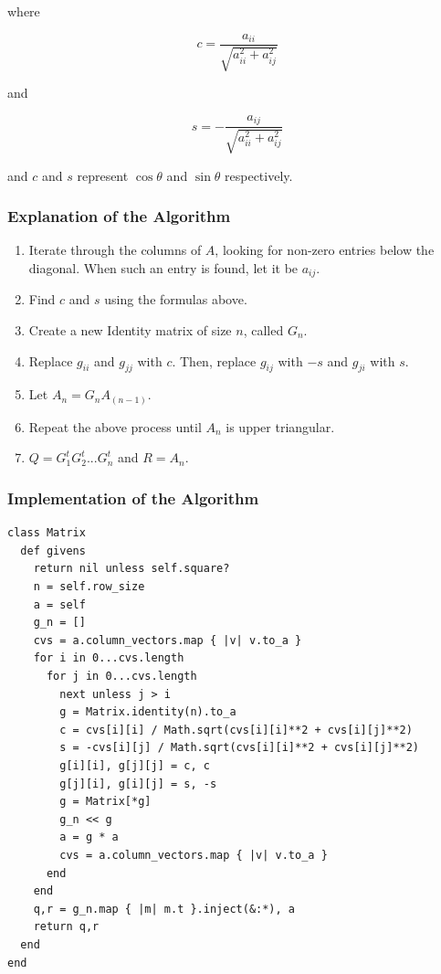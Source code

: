 \documentclass[letterpaper,12pt]{article}
\begin{document}
where

\[c = \frac{a_{ii}}{\sqrt{a^2_{ii} + a^2_{ij}}}\]

and

\[s = - \frac{a_{ij}}{\sqrt{a^2_{ii} + a^2_{ij}}}\]

and $c$ and $s$ represent $\cos{\theta}$ and $\sin{\theta}$ respectively.

\subsubsection{Explanation of the Algorithm}

\begin{enumerate}
\item Iterate through the columns of $A$, looking for non-zero entries below the diagonal.
  When such an entry is found, let it be $a_{ij}$.

\item Find $c$ and $s$ using the formulas above.

\item Create a new Identity matrix of size $n$, called $G_n$.

\item Replace $g_{ii}$ and $g_{jj}$ with $c$.
  Then, replace $g_{ij}$ with $-s$ and $g_{ji}$ with $s$.

\item Let $A_n = G_n A_{(n - 1)}$.

\item Repeat the above process until $A_n$ is upper triangular.

\item $Q = G_1^t G_2^t ... G_n^t$ and $R = A_n$.

\end{enumerate}

\subsubsection{Implementation of the Algorithm}

\lstset{caption=QR Decomposition via Givens Rotations}
\begin{lstlisting}
class Matrix
  def givens
    return nil unless self.square?
    n = self.row_size
    a = self
    g_n = []
    cvs = a.column_vectors.map { |v| v.to_a }
    for i in 0...cvs.length
      for j in 0...cvs.length
        next unless j > i
        g = Matrix.identity(n).to_a
        c = cvs[i][i] / Math.sqrt(cvs[i][i]**2 + cvs[i][j]**2)
        s = -cvs[i][j] / Math.sqrt(cvs[i][i]**2 + cvs[i][j]**2)
        g[i][i], g[j][j] = c, c
        g[j][i], g[i][j] = s, -s
        g = Matrix[*g]
        g_n << g
        a = g * a
        cvs = a.column_vectors.map { |v| v.to_a }
      end
    end
    q,r = g_n.map { |m| m.t }.inject(&:*), a
    return q,r
  end
end
\end{lstlisting}
\end{document}
